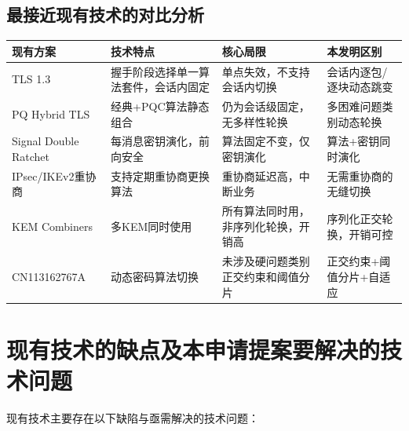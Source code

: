 \documentclass[12pt,a4paper]{article}
\begin{document}
\subsection{最接近现有技术的对比分析}

\begin{longtable}{|p{2.5cm}|p{4.5cm}|p{4.5cm}|p{3cm}|}
\hline
\textbf{现有方案} & \textbf{技术特点} & \textbf{核心局限} & \textbf{本发明区别} \\
\hline
TLS 1.3 & 握手阶段选择单一算法套件，会话内固定 & 单点失效，不支持会话内切换 & 会话内逐包/逐块动态跳变 \\
\hline
PQ Hybrid TLS & 经典+PQC算法静态组合 & 仍为会话级固定，无多样性轮换 & 多困难问题类别动态轮换 \\
\hline
Signal Double Ratchet & 每消息密钥演化，前向安全 & 算法固定不变，仅密钥演化 & 算法+密钥同时演化 \\
\hline
IPsec/IKEv2重协商 & 支持定期重协商更换算法 & 重协商延迟高，中断业务 & 无需重协商的无缝切换 \\
\hline
KEM Combiners & 多KEM同时使用 & 所有算法同时用，非序列化轮换，开销高 & 序列化正交轮换，开销可控 \\
\hline
CN113162767A & 动态密码算法切换 & 未涉及硬问题类别正交约束和阈值分片 & 正交约束+阈值分片+自适应 \\
\hline
\end{longtable}

\section{现有技术的缺点及本申请提案要解决的技术问题}

现有技术主要存在以下缺陷与亟需解决的技术问题：
\end{document}
